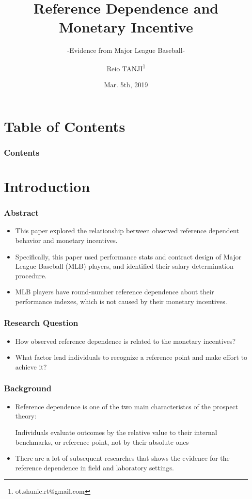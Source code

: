 \documentclass[dvipdfmx,12pt]{beamer}
\title{Reference Dependence and Monetary Incentive}
\subtitle{-Evidence from Major League Baseball-}
\author{Reio TANJI\footnote{ot.shunie.rt@gmail.com} }
\date{Mar. 5th, 2019}
\institute{Osaka University, Graduate Scool of Economics}
\begin{document}
\begin{frame}\frametitle{}
  \titlepage
\end{frame}

\section*{Table of Contents}
\begin{frame}\frametitle{Contents}
  \tableofcontents
\end{frame}

\section{Introduction}

\begin{frame}\frametitle{Abstract}
  \begin{itemize}
    \item This paper explored the relationship between observed reference dependent behavior and monetary incentives.

    \item Specifically, this paper used performance stats and contract design of Major League Baseball (MLB) players, and identified their salary determination procedure.

    \item MLB players have round-number reference dependence about their performance indexes, which is not caused by their monetary incentives.

  \end{itemize}
\end{frame}

\begin{frame}\frametitle{Research Question}
  \begin{itemize}
    \item How observed reference dependence is related to the monetary incentives?

    \item What factor lead individuals to recognize a reference point and make effort to achieve it?
  \end{itemize}
\end{frame}

\begin{frame}\frametitle{Background}

  \begin{itemize}
    \item Reference dependence is one of the two main characteristcs of the prospect theory:

    Individuals evaluate outcomes by the relative value to their internal benchmarks, or reference point, not by their absolute ones

    \item There are a lot of subsequent researches that shows the evidence for the reference dependence in field and laboratory settings.
  \end{itemize}

\end{frame}
\end{document}
